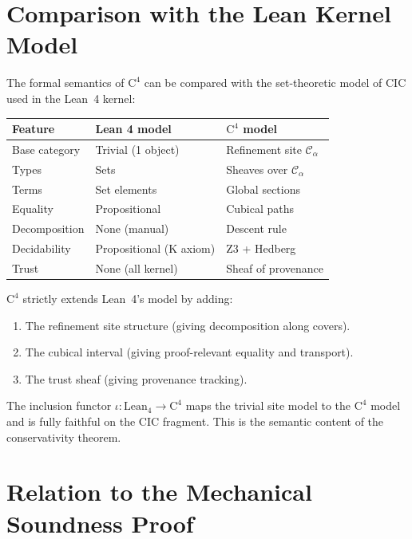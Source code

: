 \section{Comparison with the Lean Kernel Model}
\label{sec:lean-comparison}

The formal semantics of $\mathrm{C}^4$ can be compared with the
set-theoretic model of CIC used in the Lean~4 kernel:

\begin{center}
\begin{tabular}{lll}
\toprule
\textbf{Feature} & \textbf{Lean 4 model} & \textbf{$\mathrm{C}^4$ model} \\
\midrule
Base category & Trivial (1 object) & Refinement site \(\mathcal{C}_\alpha\) \\
Types & Sets & Sheaves over \(\mathcal{C}_\alpha\) \\
Terms & Set elements & Global sections \\
Equality & Propositional & Cubical paths \\
Decomposition & None (manual) & Descent rule \\
Decidability & Propositional (K axiom) & Z3 + Hedberg \\
Trust & None (all kernel) & Sheaf of provenance \\
\bottomrule
\end{tabular}
\end{center}

\(\mathrm{C}^4\) strictly extends Lean~4's model by adding:
\begin{enumerate}
\item The refinement site structure (giving decomposition along covers).
\item The cubical interval (giving proof-relevant equality and transport).
\item The trust sheaf (giving provenance tracking).
\end{enumerate}

The inclusion functor
\(\iota : \mathrm{Lean}_4 \to \mathrm{C}^4\) maps the trivial
site model to the \(\mathrm{C}^4\) model and is fully faithful on the
CIC fragment.  This is the semantic content of the conservativity theorem.


\section{Relation to the Mechanical Soundness Proof}
\label{sec:lean-proof-relation}

